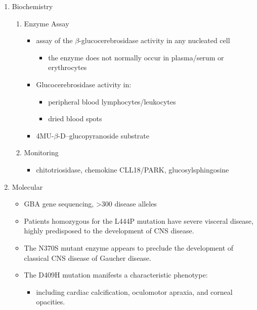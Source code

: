 \documentclass{scrartcl}
\begin{document}
\begin{enumerate}
\begin{enumerate}
\item Biochemistry
\label{sec:org63a46a4}
\begin{enumerate}
\item Enzyme Assay
\label{sec:org901f0fa}
\begin{itemize}
\item assay of the \(\beta\)-glucocerebrosidase activity in any nucleated cell
\begin{itemize}
\item the enzyme does not normally occur in plasma/serum or erythrocytes
\end{itemize}
\item Glucocerebrosidase activity in:
\begin{itemize}
\item peripheral blood lymphocytes/leukocytes
\item dried blood spots
\end{itemize}
\item 4MU-\(\beta\)-D--glucopyranoside substrate
\end{itemize}

\item Monitoring
\label{sec:org1040358}
\begin{itemize}
\item chitotriosidase, chemokine CLL18/PARK, glucosylsphingosine
\end{itemize}
\end{enumerate}

\item Molecular
\label{sec:orge06f856}
\begin{itemize}
\item GBA gene sequencing, >300 disease alleles
\item Patients homozygous for the L444P mutation have severe visceral
disease, highly predisposed to the development of CNS disease.
\item The N370S mutant enzyme appears to preclude the development of classical CNS disease of Gaucher disease.
\item The D409H mutation manifests a characteristic phenotype:
\begin{itemize}
\item including cardiac calcification, oculomotor apraxia, and corneal opacities.
\end{itemize}
\end{itemize}
\end{enumerate}


\end{enumerate}
\end{document}
